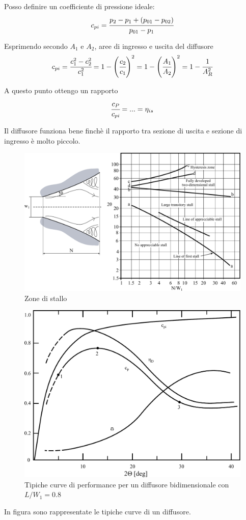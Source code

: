 Posso definire un coefficiente di pressione ideale:
\begin{equation}
c_{pi} = \cfrac{p_2 - p_1 + (p_{01} - p_{02})}{p_{01} - p_1}
\end{equation}

Esprimendo secondo $A_1$ e $A_2$, aree di ingresso e uscita del diffusore 
\begin{equation}
c_{pi} = \cfrac{c_1^2 - c_2^2}{c_1^2} = 1 - \left( \cfrac{c_2}{c_1}\right)^2 = 1- \left(\cfrac{A_1}{A_2} \right)^2 =1-\cfrac{1}{A_R^2}
\end{equation}

A questo punto ottengo un rapporto
\begin{equation}
\cfrac{c_P}{c_{pi}} = ... = \eta_{is}
\end{equation}

Il diffusore funziona bene finchè il rapporto tra sezione di uscita e sezione di ingresso è molto piccolo. 
\begin{figure}
\centering
  \includegraphics[width=.7\textwidth]{fig/stallo.pdf}
\caption{Zone di stallo}
\label{fig:stallo}
\end{figure}
\begin{figure}
\centering
  \includegraphics[width=.5\textwidth]{fig/DiffPerf.pdf}
\caption{Tipiche curve di performance per un diffusore bidimensionale con $L/W_1 = 0.8$}
\label{fig:DiffPerf}
\end{figure}
In figura sono rappresentate le tipiche curve di un diffusore.

